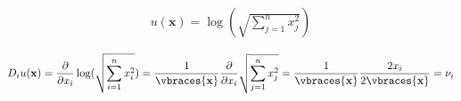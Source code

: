 \begin{solution}
\begin{align*}
    u(\textbf{x})= \log(\sqrt{\sum_{j=1}^n x_j^2})
\end{align*}

\begin{align*}
    D_i u(\textbf{x})
  = \frac{\partial}{\partial x_i} \log(\sqrt{\sum_{i=1}^n x_i^2})
  = \frac{1}{\vbraces{\textbf{x}}} \frac{\partial}{\partial x_i}
    \sqrt{\sum_{j=1}^n x_j^2}
  = \frac{1}{\vbraces{\textbf{x}}} \frac{2x_i}{2\vbraces{\textbf{x}}}
  = \nu_i
\end{align*}


\end{solution}
